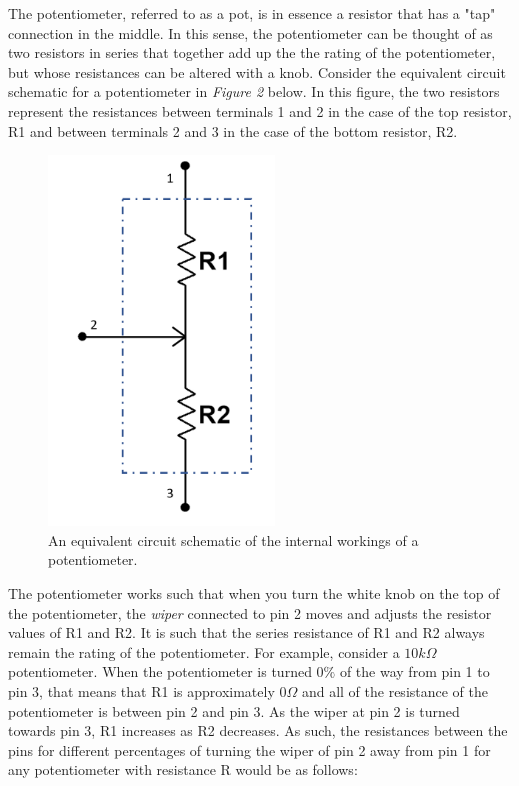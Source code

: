 \documentclass[12pt]{article}
\begin{document}
The potentiometer, referred to as a pot, is in essence a resistor that has a "tap" connection in the middle. In this sense, the potentiometer can be thought of as two resistors in series that together add up the the rating of the potentiometer, but whose resistances can be altered with a knob. Consider the equivalent circuit schematic for a potentiometer in \textit{Figure 2} below. In this figure, the two resistors represent the resistances between terminals 1 and 2 in the case of the top resistor, R1 and between terminals 2 and 3 in the case of the bottom resistor, R2. 

\begin{figure}[H]
    \centering
    \includegraphics[width=6cm]{photos/prelim/potschem.PNG}
    \caption{An equivalent circuit schematic of the internal workings of a potentiometer.}
\end{figure}

The potentiometer works such that when you turn the white knob on the top of the potentiometer, the \textit{wiper} connected to pin 2 moves and adjusts the resistor values of R1 and R2. It is such that the series resistance of R1 and R2 always remain the rating of the potentiometer. For example, consider a $10k\Omega$ potentiometer. When the potentiometer is turned $0\%$ of the way from pin 1 to pin 3, that means that R1 is approximately $0\Omega$ and all of the resistance of the potentiometer is between pin 2 and pin 3. As the wiper at pin 2 is turned towards pin 3, R1 increases as R2 decreases. As such, the resistances between the pins for different percentages of turning the wiper of pin 2 away from pin 1 for any potentiometer with resistance R would be as follows:
\end{document}
